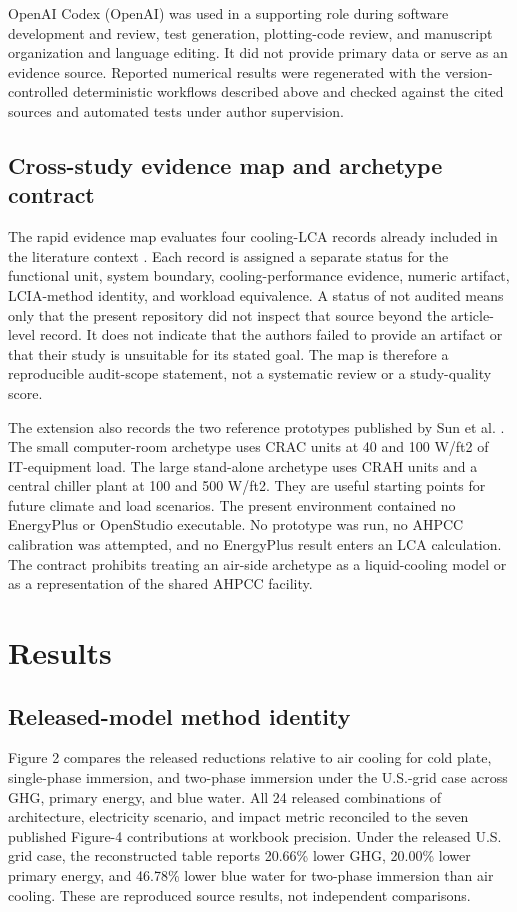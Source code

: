 \documentclass[review,12pt]{elsarticle}
\begin{document}
OpenAI Codex (OpenAI) was used in a supporting role during software development and review, test generation, plotting-code review, and manuscript organization and language editing. It did not provide primary data or serve as an evidence source. Reported numerical results were regenerated with the version-controlled deterministic workflows described above and checked against the cited sources and automated tests under author supervision.

\subsection{Cross-study evidence map and archetype contract}
The rapid evidence map evaluates four cooling-LCA records already included in the literature context \cite{ref12,ref14,ref15,ref16,ref19}. Each record is assigned a separate status for the functional unit, system boundary, cooling-performance evidence, numeric artifact, LCIA-method identity, and workload equivalence. A status of not audited means only that the present repository did not inspect that source beyond the article-level record. It does not indicate that the authors failed to provide an artifact or that their study is unsuitable for its stated goal. The map is therefore a reproducible audit-scope statement, not a systematic review or a study-quality score.

The extension also records the two reference prototypes published by Sun et al. \cite{ref49}. The small computer-room archetype uses CRAC units at 40 and 100 W/ft2 of IT-equipment load. The large stand-alone archetype uses CRAH units and a central chiller plant at 100 and 500 W/ft2. They are useful starting points for future climate and load scenarios. The present environment contained no EnergyPlus or OpenStudio executable. No prototype was run, no AHPCC calibration was attempted, and no EnergyPlus result enters an LCA calculation. The contract prohibits treating an air-side archetype as a liquid-cooling model or as a representation of the shared AHPCC facility.

\section{Results}
\subsection{Released-model method identity}
Figure 2 compares the released reductions relative to air cooling for cold plate, single-phase immersion, and two-phase immersion under the U.S.-grid case across GHG, primary energy, and blue water. All 24 released combinations of architecture, electricity scenario, and impact metric reconciled to the seven published Figure-4 contributions at workbook precision. Under the released U.S. grid case, the reconstructed table reports 20.66\% lower GHG, 20.00\% lower primary energy, and 46.78\% lower blue water for two-phase immersion than air cooling. These are reproduced source results, not independent comparisons.
\end{document}
